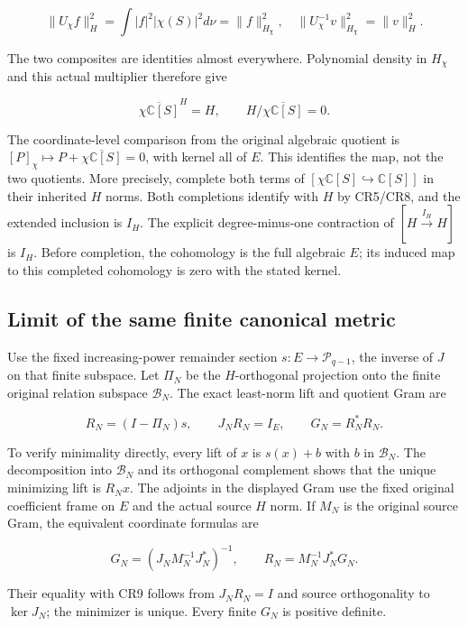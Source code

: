 \[
\|U_\chi f\|_H^2=\int|f|^2|\chi(S)|^2d\nu=\|f\|_{H_\chi}^2,
\quad
\|U_\chi^{-1}v\|_{H_\chi}^2=\|v\|_H^2.
\tag{CR7}
\]

The two composites are identities almost everywhere. Polynomial density in \(H_\chi\) and this actual multiplier therefore give

\[
\boxed{\overline{\chi\mathbb C[S]}^{H}=H,
\qquad H/\overline{\chi\mathbb C[S]}=0.}
\tag{CR8}
\]

The coordinate-level comparison from the original algebraic quotient is \([P]_\chi\mapsto P+\overline{\chi\mathbb C[S]}=0\), with kernel all of \(E\). This identifies the map, not the two quotients. More precisely, complete both terms of \([\chi\mathbb C[S]\hookrightarrow\mathbb C[S]]\) in their inherited \(H\) norms. Both completions identify with \(H\) by CR5/CR8, and the extended inclusion is \(I_H\). The explicit degree-minus-one contraction of \([H\xrightarrow{I_H}H]\) is \(I_H\). Before completion, the cohomology is the full algebraic \(E\); its induced map to this completed cohomology is zero with the stated kernel.

\subsection{Limit of the same finite canonical metric}\label{limit-of-the-same-finite-canonical-metric}

Use the fixed increasing-power remainder section \(s:E\to\mathcal P_{q-1}\), the inverse of \(J\) on that finite subspace. Let \(\Pi_N\) be the \(H\)-orthogonal projection onto the finite original relation subspace \(\mathcal B_N\). The exact least-norm lift and quotient Gram are

\[
R_N=(I-\Pi_N)s,\qquad J_NR_N=I_E,\qquad
G_N=R_N^*R_N.
\tag{CR9}
\]

To verify minimality directly, every lift of \(x\) is \(s(x)+b\) with \(b\) in \(\mathcal B_N\). The decomposition into \(\mathcal B_N\) and its orthogonal complement shows that the unique minimizing lift is \(R_Nx\). The adjoints in the displayed Gram use the fixed original coefficient frame on \(E\) and the actual source \(H\) norm. If \(M_N\) is the original source Gram, the equivalent coordinate formulas are

\[
G_N=(J_NM_N^{-1}J_N^*)^{-1},\qquad
R_N=M_N^{-1}J_N^*G_N.
\tag{CR10}
\]

Their equality with CR9 follows from \(J_NR_N=I\) and source orthogonality to \(\ker J_N\); the minimizer is unique. Every finite \(G_N\) is positive definite.

